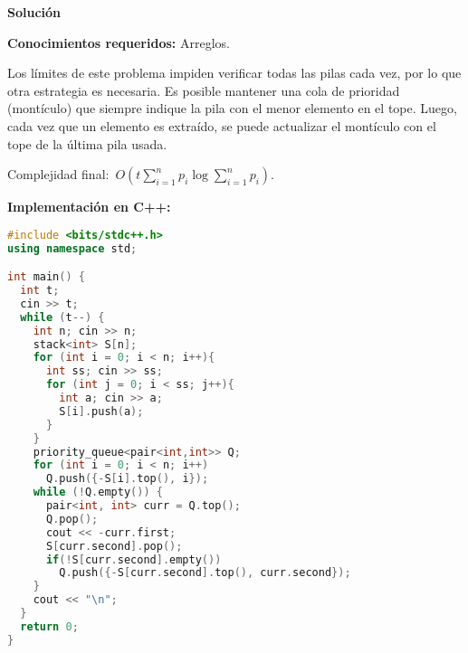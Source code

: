 \vspace*{0cm}
{\Large\textbf{Solución}}

\textbf{Conocimientos requeridos:} Arreglos.

Los límites de este problema impiden verificar todas las pilas cada vez, por lo que
otra estrategia es necesaria. Es posible mantener una cola de prioridad (montículo)
que siempre indique la pila con el menor elemento en el tope. Luego, cada vez que un
elemento es extraído, se puede actualizar el montículo con el tope de la última pila
usada.

Complejidad final:~$O(t\sum_{i=1}^np_i \log \sum_{i=1}^np_i)$.

\textbf{Implementación en C++:}

\begin{lstlisting}[language=C++]
#include <bits/stdc++.h>
using namespace std;

int main() {
  int t;
  cin >> t;
  while (t--) {
    int n; cin >> n;
    stack<int> S[n];
    for (int i = 0; i < n; i++){
      int ss; cin >> ss;
      for (int j = 0; i < ss; j++){
        int a; cin >> a;
        S[i].push(a);
      }
    }
    priority_queue<pair<int,int>> Q;
    for (int i = 0; i < n; i++)
      Q.push({-S[i].top(), i});
    while (!Q.empty()) {
      pair<int, int> curr = Q.top();
      Q.pop();
      cout << -curr.first;
      S[curr.second].pop();
      if(!S[curr.second].empty())
        Q.push({-S[curr.second].top(), curr.second});
    }
    cout << "\n";
  }
  return 0;
}
\end{lstlisting}

\newpage

